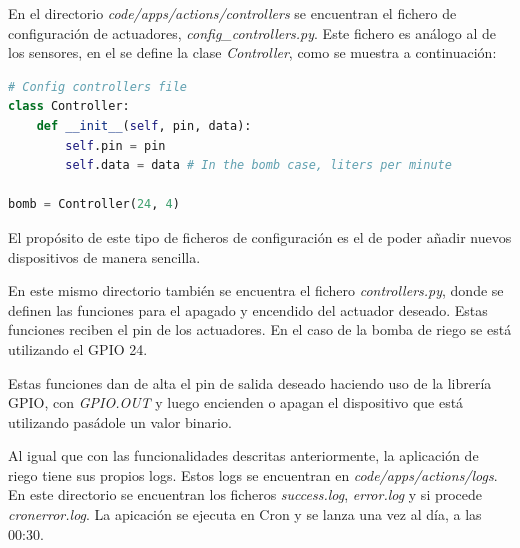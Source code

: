 \documentclass[a4paper, 12pt, oneside]{book}
\begin{document}
En el directorio \textit{code/apps/actions/controllers} se encuentran el fichero de configuración de actuadores, \textit{config\_controllers.py}. Este fichero es análogo al de los sensores, en el se define la clase \textit{Controller}, como se muestra a continuación:  

\begin{lstlisting}[language=Python]
# Config controllers file
class Controller:
    def __init__(self, pin, data):
        self.pin = pin
        self.data = data # In the bomb case, liters per minute

bomb = Controller(24, 4)
\end{lstlisting}

El propósito de este tipo de ficheros de configuración es el de poder añadir nuevos dispositivos de manera sencilla. 

En este mismo directorio también se encuentra el fichero \textit{controllers.py}, donde se definen las funciones para el apagado y encendido del actuador deseado. Estas funciones reciben el pin de los actuadores. En el caso de la bomba de riego se está utilizando el GPIO 24.

Estas funciones dan de alta el pin de salida deseado haciendo uso de la librería GPIO, con \textit{GPIO.OUT} y luego encienden o apagan el dispositivo que está utilizando pasádole un valor binario.

Al igual que con las funcionalidades descritas anteriormente, la aplicación de riego tiene sus propios logs. Estos logs se encuentran en \textit{code/apps/actions/logs}. En este directorio se encuentran los ficheros \textit{success.log}, \textit{error.log} y si procede \textit{cronerror.log}.
La apicación se ejecuta en Cron y se lanza una vez al día, a las 00:30.



%
\end{document}
